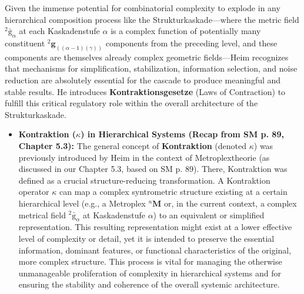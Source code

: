 \documentclass[12pt]{article}
\newcommand{\metroplex}[1]{{}^{#1}\mathbf{M}}
\newcommand{\kompositionsfeld}{{}^2\bar{\mathrm{g}}}
\newcommand{\partialstruktur}[1]{{}^2\mathbf{g}_{(#1)}}
\newcommand{\kaskadenstufe}{\alpha}
\begin{document}
Given the immense potential for combinatorial complexity to explode in any hierarchical composition process like the Strukturkaskade—where the metric field \( \kompositionsfeld_\alpha \) at each Kaskadenstufe \( \kaskadenstufe \) is a complex function of potentially many constituent \( \partialstruktur{(\alpha-1)(\gamma)} \) components from the preceding level, and these components are themselves already complex geometric fields—Heim recognizes that mechanisms for simplification, stabilization, information selection, and noise reduction are absolutely essential for the cascade to produce meaningful and stable results. He introduces \textbf{Kontraktionsgesetze} (Laws of Contraction) to fulfill this critical regulatory role within the overall architecture of the Strukturkaskade.

\begin{itemize}
    \item \textbf{Kontraktion (\( \kappa \)) in Hierarchical Systems (Recap from SM p. 89, Chapter 5.3):}
    The general concept of \textbf{Kontraktion} (denoted \( \kappa \)) was previously introduced by Heim in the context of Metroplextheorie (as discussed in our Chapter 5.3, based on SM p. 89). There, Kontraktion was defined as a crucial structure-reducing transformation. A Kontraktion operator \( \kappa \) can map a complex syntrometric structure existing at a certain hierarchical level (e.g., a Metroplex \( \metroplex{n} \) or, in the current context, a complex metrical field \( \kompositionsfeld_\alpha \) at Kaskadenstufe \( \kaskadenstufe \)) to an equivalent or simplified representation. This resulting representation might exist at a lower effective level of complexity or detail, yet it is intended to preserve the essential information, dominant features, or functional characteristics of the original, more complex structure. This process is vital for managing the otherwise unmanageable proliferation of complexity in hierarchical systems and for ensuring the stability and coherence of the overall systemic architecture.


\end{itemize}
\end{document}
